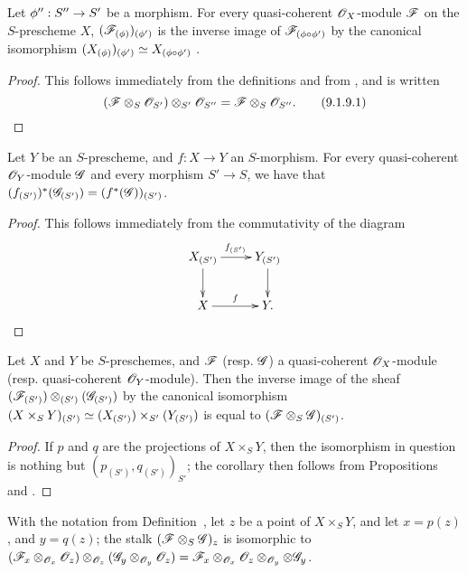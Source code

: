 \begin{prop}[9.1.9]
\label{1.9.1.9}
Let $\vphi'':S''\to S'$ be a morphism.
For every quasi-coherent $\mathscr{O}_X$-module $\mathscr{F}$ on the $S$-prescheme $X$,
$(\mathscr{F}_{(\phi)})_{(\phi')}$ is the inverse image of
$\mathscr{F}_{(\phi\circ\phi')}$ by the canonical isomorphism
$(X_{(\phi)})_{(\phi')}\simeq X_{(\phi\circ\phi')}$
.
\end{prop}

\begin{proof}
\label{proof-1.9.1.9}
This follows immediately from the definitions and from , and is
written
\[
  (\mathscr{F}\otimes_S\mathscr{O}_{S'})\otimes_{S'}\mathscr{O}_{S''}=\mathscr{F}\otimes_S\mathscr{O}_{S''}.
  \tag{9.1.9.1}\qedhere
\]
\end{proof}

\begin{prop}[9.1.10]
\label{1.9.1.10}
Let $Y$ be an $S$-prescheme, and $f:X\to Y$ an $S$-morphism.
For every quasi-coherent $\mathscr{O}_Y$-module $\mathscr{G}$ and every morphism
$S'\to S$, we have that
$(f_{(S')})^*(\mathscr{G}_{(S')})=(f^*(\mathscr{G}))_{(S')}$.
\end{prop}

\begin{proof}
\label{proof-1.9.1.10}
This follows immediately from the commutativity of the diagram
\[
  \xymatrix{
    X_{(S')}\ar[r]^{f_{(S')}}\ar[d] &
    Y_{(S')}\ar[d]\\
    X\ar[r]^f &
    Y.
  }
\]
\end{proof}

\begin{cor}[9.1.11]
\label{1.9.1.11}
Let $X$ and $Y$ be $S$-preschemes, and
$\mathscr{F}$ (resp. $\mathscr{G}$) a quasi-coherent $\mathscr{O}_X$-module
(resp. quasi-coherent $\mathscr{O}_Y$-module). Then the inverse image of the sheaf
$(\mathscr{F}_{(S')})\otimes_{(S')}(\mathscr{G}_{(S')})$ by the canonical isomorphism
$(X\times_S Y)_{(S')}\simeq(X_{(S')})\times_{S'}(Y_{(S')})$
 is equal to $(\mathscr{F}\otimes_S\mathscr{G})_{(S')}$.
\end{cor}

\begin{proof}
\label{proof-1.9.1.11}
If $p$ and $q$ are the projections of $X\times_S Y$, then the isomorphism in question
is nothing but $(p_{(S')}, q_{(S')})_{S'}$; the corollary then follows from
Propositions~ and .
\end{proof}

\begin{prop}[9.1.12]
\label{1.9.1.12}
With the notation from Definition~, let $z$ be
a point of $X\times_S Y$, and let $x=p(z)$, and $y=q(z)$; the stalk
$(\mathscr{F}\otimes_S\mathscr{G})_z$ is isomorphic to
$(\mathscr{F}_x\otimes_{\mathscr{O}_x}\mathscr{O}_z)\otimes_{\mathscr{O}_z}(\mathscr{G}_y\otimes_{\mathscr{O}_y}\mathscr{O}_z)
  =\mathscr{F}_x\otimes_{\mathscr{O}_x}\mathscr{O}_z\otimes_{\mathscr{O}_y}\otimes\mathscr{G}_y$.
\end{prop}

